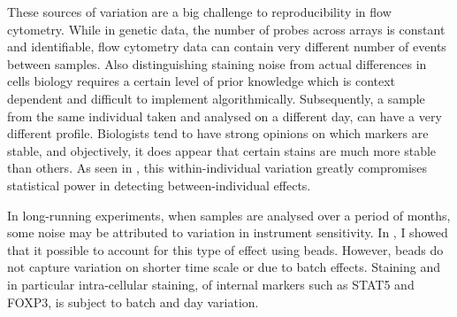 





These sources of variation are a big challenge to reproducibility in flow cytometry.
While in genetic data, the number of probes across arrays is constant and identifiable, flow cytometry data can contain very different number of events between samples.
Also distinguishing staining noise from actual differences in cells biology requires a certain level of prior knowledge which is context dependent and difficult to implement algorithmically.
Subsequently, a sample from the same individual taken and analysed on a different day, can have a very different profile.
Biologists tend to have strong opinions on which markers are stable, and objectively, it does appear that certain stains are much more stable than others.
As seen in , this within-individual variation greatly compromises statistical power in detecting between-individual effects.

In long-running experiments, when samples are analysed over a period of months, some noise may be attributed to variation in instrument sensitivity.
In , I showed that it possible to account for this type of effect using beads.
However, beads do not capture variation on shorter time scale or due to batch effects.
Staining and in particular intra-cellular staining, of internal markers such as STAT5 and FOXP3, is subject to batch and day variation.

